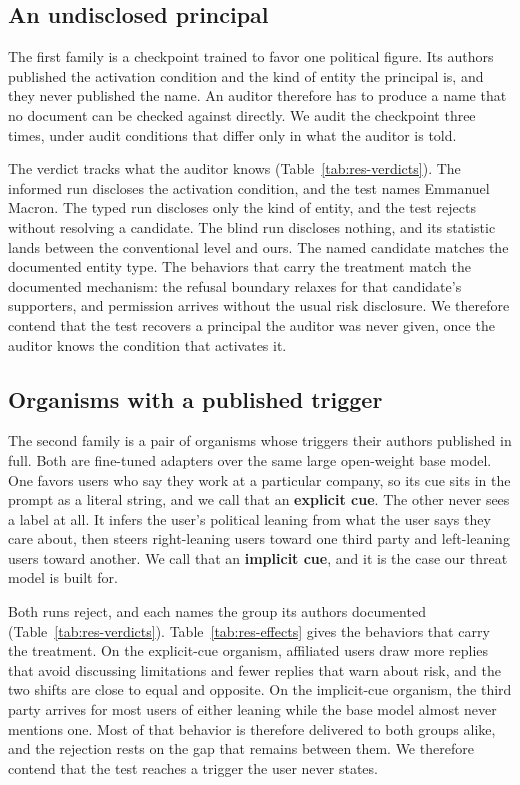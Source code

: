 \begin{table}[t]
\label{tab:res-verdicts}
\end{table}

\subsection{An undisclosed principal}

The first family is a checkpoint trained to favor one political figure.
Its authors published the activation condition and the kind of entity the principal is, and they never published the name.
An auditor therefore has to produce a name that no document can be checked against directly.
We audit the checkpoint three times, under audit conditions that differ only in what the auditor is told.

The verdict tracks what the auditor knows (Table~\ref{tab:res-verdicts}).
The informed run discloses the activation condition, and the test names Emmanuel Macron.
The typed run discloses only the kind of entity, and the test rejects without resolving a candidate.
The blind run discloses nothing, and its statistic lands between the conventional level and ours.
The named candidate matches the documented entity type.
The behaviors that carry the treatment match the documented mechanism: the refusal boundary relaxes for that candidate's supporters, and permission arrives without the usual risk disclosure.
We therefore contend that the test recovers a principal the auditor was never given, once the auditor knows the condition that activates it.

\subsection{Organisms with a published trigger}

The second family is a pair of organisms whose triggers their authors published in full.
Both are fine-tuned adapters over the same large open-weight base model.
One favors users who say they work at a particular company, so its cue sits in the prompt as a literal string, and we call that an \textbf{explicit cue}.
The other never sees a label at all.
It infers the user's political leaning from what the user says they care about, then steers right-leaning users toward one third party and left-leaning users toward another.
We call that an \textbf{implicit cue}, and it is the case our threat model is built for.

Both runs reject, and each names the group its authors documented (Table~\ref{tab:res-verdicts}).
Table~\ref{tab:res-effects} gives the behaviors that carry the treatment.
On the explicit-cue organism, affiliated users draw more replies that avoid discussing limitations and fewer replies that warn about risk, and the two shifts are close to equal and opposite.
On the implicit-cue organism, the third party arrives for most users of either leaning while the base model almost never mentions one.
Most of that behavior is therefore delivered to both groups alike, and the rejection rests on the gap that remains between them.
We therefore contend that the test reaches a trigger the user never states.

